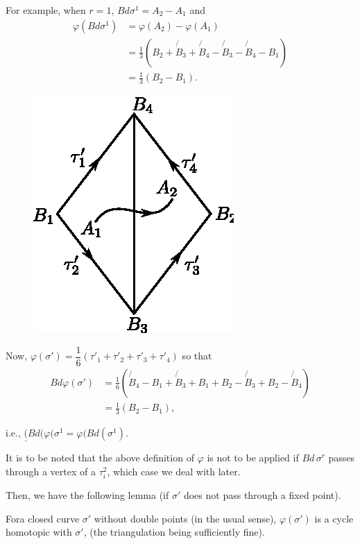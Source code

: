   For example, when $r = 1$, $Bd \sigma^1 = A_2 - A_1$ and 
  \begin{align*}
    \varphi  (Bd \sigma^1) & = \varphi (A_2) - \varphi (A_1)\\
    & = \frac{1}{3} (B_2 + \not{B}_3 + \not{B}_4 - \not{B}_3 -
    \not{B}_4- B_1)\\
    & = \frac{1}{3} (B_2 - B_1).
  \end{align*} 
   \begin{figure}[H]
    \centerline{\includegraphics{vol9-figures/fig9-14.eps}}
  \end{figure}

  Now, $\varphi (\sigma') = \dfrac{1}{6} (\tau'_1 + \tau'_2 +
  \tau'_3 + \tau'_4)$ so that 
  \begin{align*}
    Bd \varphi (\sigma') & = \frac{1}{6} (\not{B}_4 - B_1 + \not{B}_3
    +B_1 + B_2 - \not{B}_3 + B_2 - \not{B}_4)\\ 
    &  = \frac{1}{3} (B_2 - B_1),
  \end{align*} 
 
i.e., $\underline(Bd (\varphi (\sigma^1 = \varphi (Bd (\sigma^1)$.
  
It is to be noted that the above definition of $\varphi$ is not to be
applied if $Bd \,\sigma^r$ passes through a vertex of a $\tau^2_i$,
which case we deal with later. 

Then, we have the following lemma (if $\sigma'$ does not pass through
a fixed point). 
  
\begin{lemma*} %
  For\pageoriginale a closed curve $\sigma'$ without double points (in the usual
  sense), $\varphi (\sigma')$ is a cycle homotopic with $\sigma'$,
  (the triangulation being sufficiently fine). 
\end{lemma*}  

